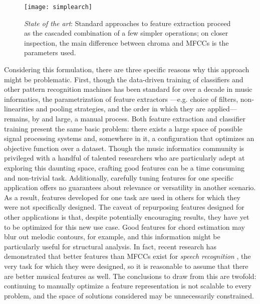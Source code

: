 \begin{figure}[t]
\begin{centering}
\texttt{[image: simplearch]}
\caption{\emph{State of the art}: Standard approaches to feature extraction proceed as the cascaded combination of a few simpler operations; on closer inspection, the main difference between chroma and MFCCs is the parameters used.}
\label{fig:simplearch}
\end{centering}
\end{figure}


Considering this formulation, there are three specific reasons why this approach might be problematic.
First, though the data-driven training of classifiers and other pattern recognition machines has been standard for over a decade in music informatics, the parametrization of feature extractors ---e.g. choice of filters, non-linearities and pooling strategies, and the order in which they are applied--- remains, by and large, a manual process.
Both feature extraction and classifier training present the same basic problem: there exists a large space of possible signal processing systems and, somewhere in it, a configuration that optimizes an objective function over a dataset.
Though the music informatics community is privileged with a handful of talented researchers who are particularly adept at exploring this daunting space, crafting good features can be a time consuming and non-trivial task.
Additionally, carefully tuning features for one specific application offers no guarantees about relevance or versatility in another scenario.
As a result, features developed for one task are used in others for which they were not specifically designed.
The caveat of repurposing features designed for other applications is that, despite potentially encouraging results, they have yet to be optimized for this new use case.
Good features for chord estimation may blur out melodic contours, for example, and this information might be particularly useful for structural analysis.
In fact, recent research has demonstrated that better features than MFCCs exist for \emph{speech recognition} \cite{Hinton2012}, the very task for which they were designed, so it is reasonable to assume that there are better musical features as well.
The conclusions to draw from this are twofold: continuing to manually optimize a feature representation is not scalable to every problem, and the space of solutions considered may be unnecessarily constrained.


